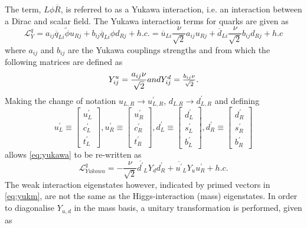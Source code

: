 The term, $L\phi\overline{R}$, is referred to as a Yukawa interaction, i.e. an interaction between a Dirac and scalar field.  The Yukawa interaction terms for quarks are given as
\begin{equation}
  \mathcal{L}^{q}_{Y} = a_{ij}\overline{q}_{Li}\tilde{\phi}u_{Rj} + b_{ij}\overline{q}_{Li}\phi d_{Rj} + h.c.%
  =%
   \overline{u}_{Li}\frac{\nu}{\sqrt{2}}a_{ij}u_{Rj} + \overline{d}_{Li}\frac{\nu}{\sqrt{2}} b_{ij}d_{Rj} + h.c
\label{eq:yukawa}
\end{equation}
where $a_{ij}$ and $b_{ij}$ are the Yukawa couplings strengths and from which the following matrices are defined as
\begin{equation}
  Y^{u}_{ij} = \frac{a_{ij}\nu}{\sqrt{2}} $$and$$ \\
  Y^{d}_{ij} = \frac{b_{ij}\nu}{\sqrt{2}}.
  \label{mass}
\end{equation}
Making the change of notation $u_{L,R}\to u^{\prime}_{L,R}$, $d_{L.R}\to d^{\prime}_{L,R}$ and defining
\begin{equation}
  u^{\prime}_{L} \equiv \begin{bmatrix}u^{\prime}_{L}\\c_{L}^{\prime}\\t^{\prime}_{L}\end{bmatrix},
  u^{\prime}_{R} \equiv \begin{bmatrix}u^{\prime}_{R}\\c_{R}^{\prime}\\t^{\prime}_{R}\end{bmatrix},
  d^{\prime}_{L} \equiv \begin{bmatrix}d^{\prime}_{L}\\s_{L}^{\prime}\\b^{\prime}_{L}\end{bmatrix},
  d^{\prime}_{R} \equiv \begin{bmatrix}d^{\prime}_{R}\\s_{R}^{\prime}\\b^{\prime}_{R}\end{bmatrix}
  \label{eq:yukdef1}
\end{equation}
allows \autoref{eq:yukawa} to be re-written as
\begin{equation}
  \mathcal{L}^{q}_{Yukawa} = -\frac{\nu}{\sqrt{2}}{\overline{d^{\prime}}_{L}Y_{d}d^{\prime}_{R} + \overline{u^{\prime}}_{L}Y_{u}u^{\prime}_{R} + h.c.}
  \label{eq:yukm}
\end{equation}
The weak interaction eigenstates however, indicated by primed vectors in \autoref{eq:yukm}, are not the same as the Higgs-interaction (mass) eigenstates. In order to diagonalise $Y_{u,d}$ in the mass basis, a unitary transformation is performed, given as

